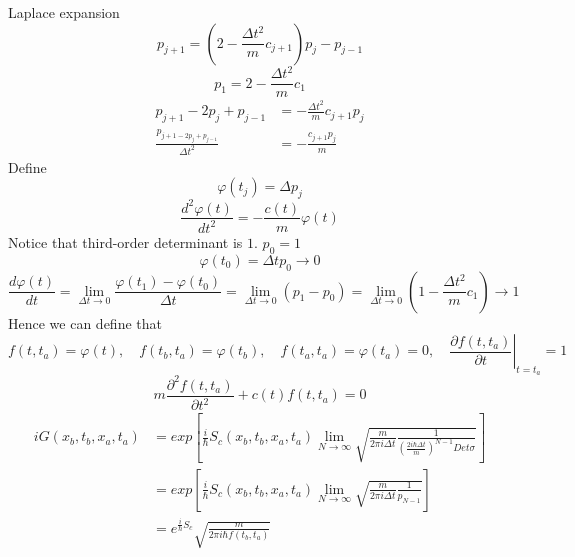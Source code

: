 \documentclass[a4paper,11pt]{article}
\begin{document}
Laplace expansion
\begin{equation*}
  p_{j+1}=(2-\frac{\Delta t^2}{m}c_{j+1})p_{j}-p_{j-1}
\end{equation*}
\begin{equation*}
  p_1=2-\frac{\Delta t^2}{m}c_1
\end{equation*}
\begin{equation*}
  \begin{split}
     p_{j+1}-2p_j+p_{j-1}&=-\frac{\Delta t^2}{m}c_{j+1}p_j\\
       \frac{p_{j+1-2p_j+p_{j-1}}}{\Delta t^2}&=-\frac{c_{j+1}p_j}{m}
  \end{split}
\end{equation*}
Define
\begin{equation*}
  \varphi(t_j)=\Delta p_j
\end{equation*}
\begin{equation*}
  \frac{d^2\varphi(t)}{dt^2}=-\frac{c(t)}{m}\varphi(t)
\end{equation*}
Notice that third-order determinant is $1$. $p_0=1$
\begin{equation*}
  \varphi(t_0)=\Delta tp_0\to 0
\end{equation*}
\begin{equation*}
  \frac{d\varphi(t)}{dt}=\lim_{\Delta t\to0}\frac{\varphi(t_1)-\varphi(t_0)}{\Delta t}=\lim_{\Delta t\to 0}(p_1-p_0)=\lim_{\Delta t\to 0}(1-\frac{\Delta t^2}{m}c_1)\to 1
\end{equation*}
Hence we can define that
\begin{equation*}
  f(t,t_a)=\varphi(t),\quad f(t_b,t_a)=\varphi(t_b),\quad f(t_a,t_a)=\varphi(t_a)=0,\quad \left.\frac{\partial f(t,t_a)}{\partial t}\right|_{t=t_a}=1
\end{equation*}
\begin{equation*}
  m\frac{\partial^2f(t,t_a)}{\partial t^2}+c(t)f(t,t_a)=0
\end{equation*}
\begin{equation*}
  \begin{split}
     iG(x_b,t_b,x_a,t_a)&=exp\left[\frac{i}{\hbar}S_c(x_b,t_b,x_a,t_a)\lim_{N\to\infty}\sqrt{\frac{m}{2\pi i\Delta t}\frac{1}{(\frac{2i\hbar\Delta t}{m})^{N-1}Det\sigma}}\right]\\
       &=exp\left[\frac{i}{\hbar}S_c(x_b,t_b,x_a,t_a)\lim_{N\to\infty}\sqrt{\frac{m}{2\pi i\Delta t}\frac{1}{p_{N-1}}}\right]\\
       &=e^{\frac{i}{\hbar}S_c}\sqrt{\frac{m}{2\pi i\hbar f(t_b,t_a)}}
  \end{split}
\end{equation*}
\end{document}
